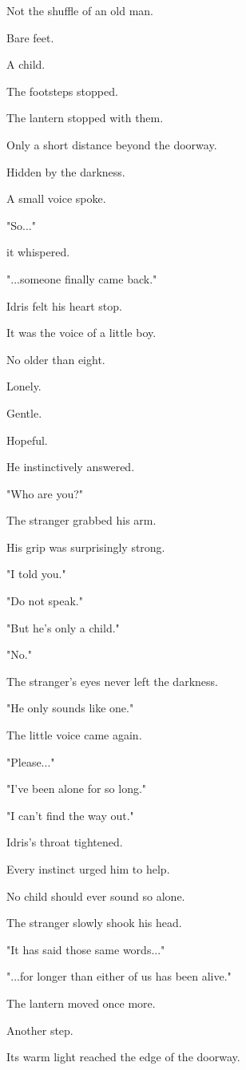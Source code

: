 \documentclass[12pt,openany]{book}
\begin{document}
Not the shuffle of an old man.

Bare feet.

A child.

The footsteps stopped.

The lantern stopped with them.

Only a short distance beyond the doorway.

Hidden by the darkness.

A small voice spoke.

"So..."

it whispered.

"...someone finally came back."

Idris felt his heart stop.

It was the voice of a little boy.

No older than eight.

Lonely.

Gentle.

Hopeful.

He instinctively answered.

"Who are you?"

The stranger grabbed his arm.

His grip was surprisingly strong.

"I told you."

"Do not speak."

"But he's only a child."

"No."

The stranger's eyes never left the darkness.

"He only sounds like one."

The little voice came again.

"Please..."

"I've been alone for so long."

"I can't find the way out."

Idris's throat tightened.

Every instinct urged him to help.

No child should ever sound so alone.

The stranger slowly shook his head.

"It has said those same words..."

"...for longer than either of us has been alive."

The lantern moved once more.

Another step.

Its warm light reached the edge of the doorway.
\end{document}
